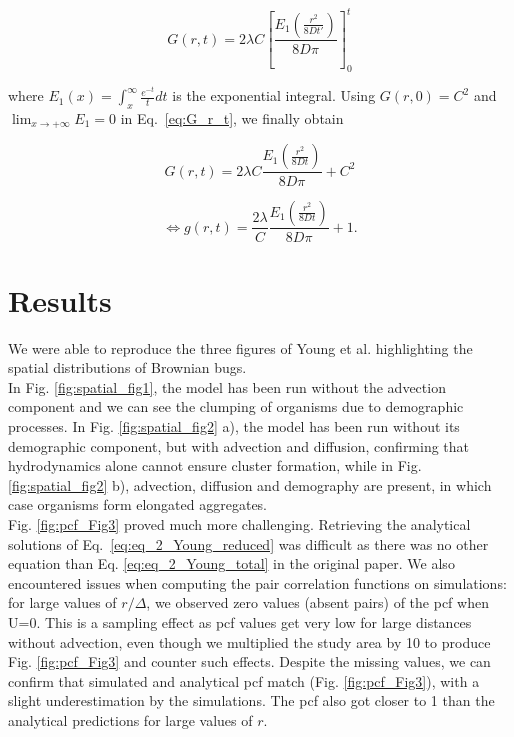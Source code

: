 \begin{equation}
G(r,t)=2\lambda C\left[\frac{E_1 \left(\frac{r^{2}}{8Dt'}\right)}{8D\pi}\right]_{0}^{t}\label{eq:G_r_t}
\end{equation}

where $E_1(x)=\int_x^\infty \frac{e^{-t}}{t}dt$ is the exponential integral. Using $G(r,0)=C^{2}$ and
$\lim_{x\rightarrow+\infty}E_1=0$ in Eq.~\ref{eq:G_r_t}, we finally obtain

\begin{equation}
G(r,t)=2\lambda C\frac{E_1\left(\frac{r^{2}}{8Dt}\right)}{8D\pi}+C^{2}
\end{equation}

\begin{equation}
\Leftrightarrow g(r,t)=\frac{2\lambda}{C}\frac{E_1\left(\frac{r^{2}}{8Dt}\right)}{8D\pi}+1.
\end{equation}

\section*{Results}

We were able to reproduce the three figures of Young et al. \cite{young_reproductive_2001} highlighting the spatial distributions of Brownian bugs.\\

In Fig. \ref{fig:spatial_fig1}, the model has been run without the advection component and we can see the clumping of organisms due to demographic processes. In Fig. \ref{fig:spatial_fig2} a), the model has been run without its demographic component, but with advection and diffusion, confirming that hydrodynamics alone cannot ensure cluster formation, while in Fig.  \ref{fig:spatial_fig2} b), advection, diffusion and demography are present, in which case organisms form elongated aggregates.\\
  
Fig. \ref{fig:pcf_Fig3} proved much more challenging. Retrieving the analytical solutions of Eq.~\ref{eq:eq_2_Young_reduced} was difficult as there was no other equation than Eq. \ref{eq:eq_2_Young_total} in the original paper. We also encountered issues when computing the pair correlation functions on simulations: for large values of $r/\Delta$, we observed zero values (absent pairs) of the pcf when U=0. This is a sampling effect as pcf values get very low for large distances without advection, even though we multiplied the study area by 10 to produce Fig.  \ref{fig:pcf_Fig3} and counter such effects. Despite the missing values, we can confirm that simulated and analytical pcf match (Fig. \ref{fig:pcf_Fig3}), with a slight underestimation by the simulations. The pcf also got closer to 1 than the analytical predictions for large values of $r$. %


